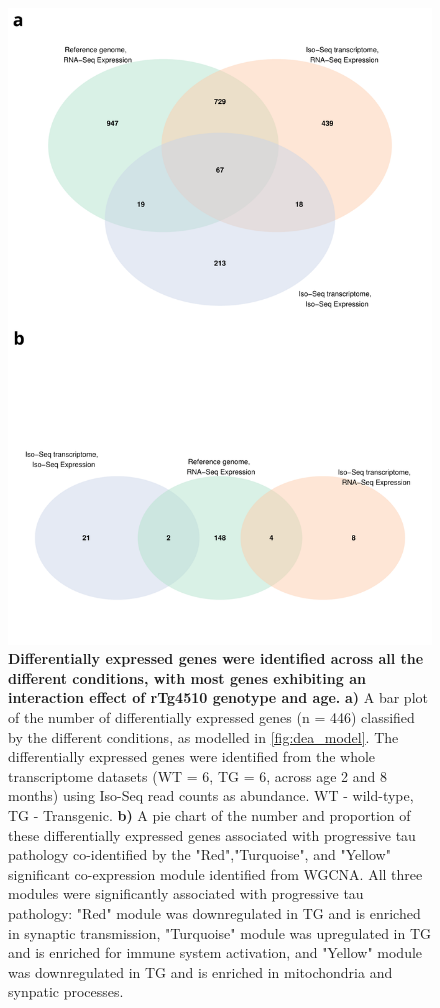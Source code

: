 \begin{figure}[h]
	\centering
	\includegraphics[page=5,trim={0 20cm 0 0},clip,scale = 0.55]{Figures/WholeDifferentialAnalysis.pdf}
	\captionsetup{width=0.95\textwidth}
	\caption[Differentially expressed genes classified by conditions]%
	{\textbf{Differentially expressed genes were identified across all the different conditions, with most genes exhibiting an interaction effect of rTg4510 genotype and age.} \textbf{a)} A bar plot of the number of differentially expressed genes (n = 446) classified by the different conditions, as modelled in \cref{fig:dea_model}. The differentially expressed genes were identified from the whole transcriptome datasets (WT = 6, TG = 6, across age 2 and 8 months) using Iso-Seq read counts as abundance. WT - wild-type, TG - Transgenic. \textbf{b)} A pie chart of the number and proportion of these differentially expressed genes associated with progressive tau pathology co-identified by the "Red","Turquoise", and "Yellow" significant co-expression module identified from WGCNA. All three modules were significantly associated with progressive tau pathology: "Red" module was downregulated in TG and is enriched in synaptic transmission, "Turquoise" module was upregulated in TG and is enriched for immune system activation, and "Yellow" module was downregulated in TG and is enriched in mitochondria and synpatic processes.}    
	\label{fig:dea_model_num}
\end{figure}

